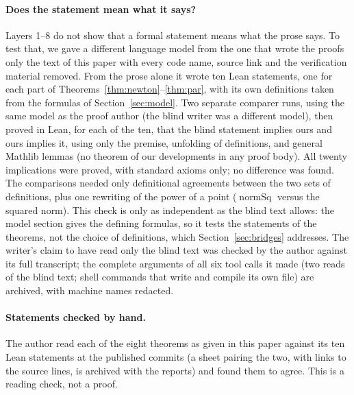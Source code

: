\documentclass[11pt]{article}
\theoremstyle{definition}
\theoremstyle{remark}
\begin{document}
\paragraph{Does the statement mean what it says?}\label{sec:blind} Layers 1--8 do not show that a formal
statement means what the prose says. To test that, we gave a different language model from the one that
wrote the proofs only the text of this paper with every code name, source link and the verification
material removed. From the prose alone it wrote ten Lean statements, one for each part of
Theorems~\ref{thm:newton}--\ref{thm:par}, with its own definitions taken from the formulas of
Section~\ref{sec:model}. Two separate comparer runs, using the same model as the proof author (the blind
writer was a different model), then proved in Lean, for each of the ten, that the blind statement
implies ours and ours implies it, using only the premise, unfolding of definitions, and
general Mathlib lemmas (no theorem of our developments in any proof body). All twenty implications were
proved, with standard axioms only; no difference was found. The comparisons needed only definitional
agreements between the two sets of definitions, plus one rewriting of the power of a point
($\operatorname{normSq}$ versus the squared norm). This check is only as independent as the blind text
allows: the model section gives the defining formulas, so it tests the statements of the theorems, not
the choice of definitions, which Section~\ref{sec:bridges} addresses. The writer's claim to have read
only the blind text was checked by the author against its full transcript; the complete arguments of
all six tool calls it made (two reads of the blind text; shell commands that write and compile its own
file) are archived, with machine names redacted.

\paragraph{Statements checked by hand.} The author read each of the eight theorems as given in this
paper against its ten Lean statements at the published commits (a sheet pairing the two, with links to
the source lines, is archived with the reports) and found them to agree. This is a reading check, not a
proof.
\end{document}
